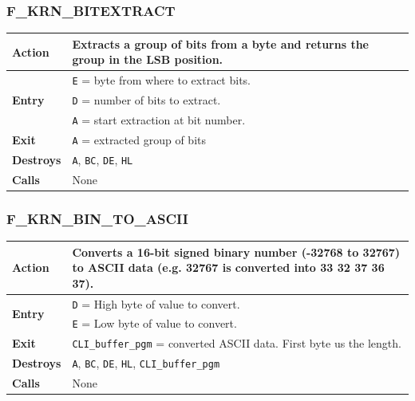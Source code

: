 \documentclass[a4paper,11pt]{article}
\begin{document}
        \subsubsection{F\_KRN\_BITEXTRACT}
        \label{func:fkrnbitextract}
        \begin{tabular}{l p{9cm}}
            \hline\textbf{Action}
            & Extracts a group of bits from a byte and returns the group in the
            LSB position.\\
            \hline\multirow[t]{3}{4em}{\textbf{Entry}}
            & \texttt{E} = byte from where to extract bits.\\
            & \texttt{D} = number of bits to extract.\\
            & \texttt{A} = start extraction at bit number.\\
            \hline\textbf{Exit} & \texttt{A} = extracted group of bits\\
            \hline\textbf{Destroys} & \texttt{A}, \texttt{BC}, \texttt{DE}, 
            \texttt{HL}\\
            \hline\textbf{Calls} & None\\
            \hline
        \end{tabular}

        \subsubsection{F\_KRN\_BIN\_TO\_ASCII}
        \label{func:fkrnbintoascii}
        \begin{tabular}{l p{9cm}}
            \hline\textbf{Action}
            & Converts a 16-bit signed binary number (-32768 to 32767) to ASCII
            data (e.g. 32767 is converted into 33 32 37 36 37).\\
            \hline\multirow[t]{2}{4em}{\textbf{Entry}}
            & \texttt{D} = High byte of value to convert.\\
            & \texttt{E} = Low byte of value to convert.\\
            \hline\textbf{Exit} & \texttt{CLI\_buffer\_pgm} = converted ASCII data.
            First byte us the length.\\
            \hline\textbf{Destroys} & \texttt{A}, \texttt{BC}, \texttt{DE}, 
            \texttt{HL}, \texttt{CLI\_buffer\_pgm}\\
            \hline\textbf{Calls} & None\\
            \hline
        \end{tabular}
\end{document}

